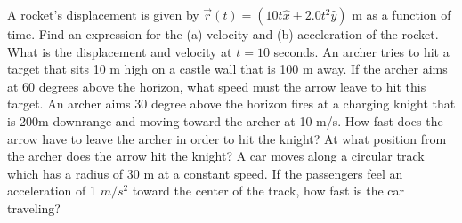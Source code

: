 \documentclass[12pt]{article}
\begin{document}
\noindent A rocket's displacement is given by $\vec{r}(t) = (10 t \hat{x} + 2.0 t^2 \hat{y})$ m  as a function of time.  Find an expression for the (a) velocity and (b) acceleration of the rocket.  What is the displacement and velocity at $t=10$ seconds.
\newpage
\noindent An archer tries to hit a target that sits 10 m high on a castle wall that is 100 m away.  If the archer aims at 60 degrees above the horizon, what speed must the arrow leave to hit this target.
\newpage
\noindent An archer aims 30 degree above the horizon fires at a
charging knight that is 200m downrange and moving toward the archer
at 10 m/s.  How fast does the arrow have to leave the
archer in order to hit the knight?  At what position from the archer
does the arrow hit the knight?     
\newpage
\noindent A car moves along a circular track which has a radius of 30 m at a constant speed.  If the passengers feel an acceleration of 1 $m/s^2$ toward the center of the track, how fast is the car traveling?
\end{document}
